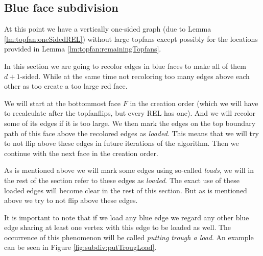 
\subsection{Blue face subdivision}
\thispagestyle{plain}
\label{ss:subdiv}
At this point we have a vertically one-sided graph (due to Lemma \ref{lm:topfan:oneSidedREL}) without large topfans except possibly for the locations provided in Lemma \ref{lm:topfan:remainingTopfans}.

In this section we are going to recolor edges in blue faces to make all of them $d+1$-sided. While at the same time not recoloring too many edges above each other as too create a too large red face.

We will start at the bottommost face $F$ in the creation order (which we will have to recalculate after the topfanflips, but every REL has one). And we will recolor some of its edges if it is too large. 
We then mark the edges on the top boundary path of this face above the recolored edges as \emph{loaded}. This means that we will try to not flip above these edges in future iterations of the algorithm.
Then we continue with the next face in the creation order.

As is mentioned above we will mark some edges using so-called \emph{loads}, we will in the rest of the section refer to these edges as \emph{loaded}. The exact use of these loaded edges will become clear in the rest of this section. But as is mentioned above we try to not flip above these edges.

It is important to note that if we load any blue edge we regard any other blue edge sharing at least one vertex with this edge to be loaded as well. The occurrence of this phenomenon will be called \emph{putting trough a load}. An example can be seen in Figure \ref{fig:subdiv:putTrougLoad}.

